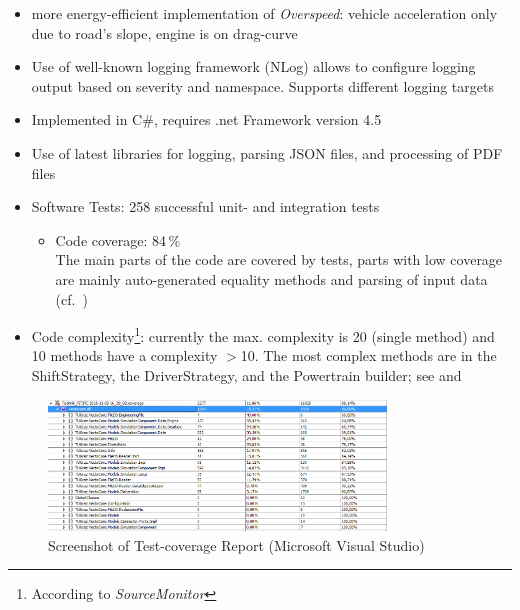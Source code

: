 \begin{itemize}
	\item more energy-efficient implementation of \textit{Overspeed}: vehicle acceleration only due to road's slope, engine is on drag-curve
	\item Use of well-known logging framework (NLog) allows to configure logging output based on severity and namespace. Supports different logging targets
	\item Implemented in C\#, requires .net Framework version 4.5
	\item Use of latest libraries for logging, parsing JSON files, and processing of PDF files
	\item Software Tests: 258 successful unit- and integration tests
	\begin{itemize}
		\item Code coverage: 84\,\% \\
		The main parts of the code are covered by tests, parts with low coverage are mainly auto-generated equality methods and parsing of input data (cf.~)
	\end{itemize}
	\item Code complexity\footnote{According to \textit{SourceMonitor}}: currently the max. complexity is 20 (single method) and 10 methods have a complexity $>$10. The most complex methods are in the ShiftStrategy, the DriverStrategy, and the Powertrain builder; see  and 
\end{itemize}

\begin{figure}
	\centering
	\includegraphics[width=0.8\textwidth]{img/Vecto3_0_1_TestCoverage.png}
	\caption{Screenshot of Test-coverage Report (Microsoft Visual Studio)}
	\label{fig:Vecto301_TestCoverage}
\end{figure}

